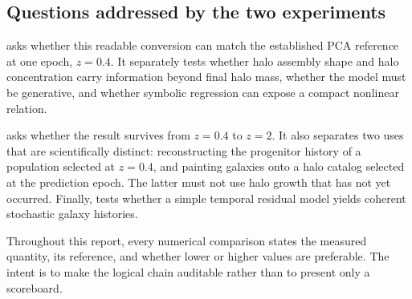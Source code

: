 \subsection{Questions addressed by the two experiments}

\ExpFifty{} asks whether this readable conversion can match the established PCA
reference at one epoch, $z=0.4$. It separately tests whether halo assembly shape
and halo concentration carry information beyond final halo mass, whether the
model must be generative, and whether symbolic regression can expose a compact
nonlinear relation.

\ExpFiftyOne{} asks whether the result survives from $z=0.4$ to $z=2$. It also
separates two uses that are scientifically distinct: reconstructing the
progenitor history of a population selected at $z=0.4$, and painting galaxies
onto a halo catalog selected at the prediction epoch. The latter must not use
halo growth that has not yet occurred. Finally, \ExpFiftyOne{} tests whether a
simple temporal residual model yields coherent stochastic galaxy histories.

Throughout this report, every numerical comparison states the measured
quantity, its reference, and whether lower or higher values are preferable.
The intent is to make the logical chain auditable rather than to present only a
scoreboard.
